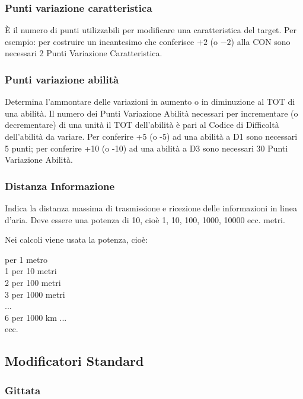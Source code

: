\iffullversion
\subsubsection{Punti variazione caratteristica}

\`E il numero di punti utilizzabili per modificare una caratteristica del target. Per
esempio: per costruire un incantesimo che conferisce $+2$ (o $-2$) alla CON sono
necessari 2 Punti Variazione Caratteristica. 
\fi

\subsubsection{Punti variazione abilit\`a}

Determina l'ammontare delle variazioni in aumento o in diminuzione al TOT di
una abilit\`a. Il numero dei Punti Variazione Abilit\`a necessari per
incrementare (o decrementare) di una unit\`a il TOT dell'abilit\`a \`e
pari al Codice di Difficolt\`a dell'abilit\`a da variare. Per conferire
+5 (o -5) ad una abilit\`a a D1 sono necessari 5 punti; per conferire +10
(o -10) ad una abilit\`a a D3 sono necessari 30 Punti Variazione Abilit\`a.

\subsubsection{Distanza Informazione} 

Indica la distanza massima di trasmissione e
ricezione delle informazioni in linea d'aria. Deve essere una potenza di 10,
cio\`e 1, 10, 100, 1000, 10000 ecc. metri. 

Nei calcoli viene usata la potenza, cio\`e:

 per 1 metro\\ 
1 per 10 metri\\ 
2 per 100 metri \\
3 per 1000 metri\\
 ...\\
6 per 1000 km ... \\
ecc.

\subsection{Modificatori Standard}

\subsubsection{Gittata} 

